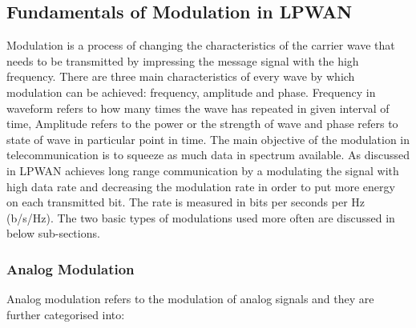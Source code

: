 \documentclass[12pt]{article}
\begin{document}

\subsection{Fundamentals of Modulation in LPWAN}

Modulation is a process of changing the characteristics of the carrier wave that needs to be transmitted by impressing the message signal with the high frequency. There are three main characteristics of every wave by which modulation can be achieved: frequency, amplitude and phase. Frequency in waveform refers to how many times the wave has repeated in given interval of time, Amplitude refers to the power or the strength of wave and phase refers to state of wave in particular point in time. The main objective of the modulation in telecommunication is to squeeze as much data in spectrum available. As discussed in \cite{raza2017low} LPWAN achieves long range communication by a modulating the signal with high data rate and decreasing the modulation rate in order to put more energy on each transmitted bit. The rate is measured in bits per seconds per Hz (b/s/Hz). The two basic types of modulations used more often are discussed in below sub-sections.
    \subsubsection{Analog Modulation} 
    Analog modulation refers to the modulation of analog signals and they are further categorised into:
    
\end{document}
